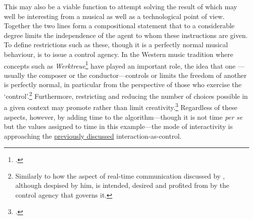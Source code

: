 This may also be a viable function to attempt solving the result of which may well be interesting from a musical as well as a technological point of view. Together the two lines form a compositional statement that to a considerable degree limits the independence of the agent to whom these instructions are given. To define restrictions such as these, though it is a perfectly normal musical behaviour, is to issue a control agency. In the Western music tradition where concepts such as \emph{Werktreue}\footcites(The German word \emph{Werktreue} means `to be faithful to the original'. It is commonly used in discussions concerning musical interpretation and musical ontology.)()[See][3]{benson03}[See also][]{goehr96} have played an important role, the idea that one ---usually the composer or the conductor---controls or limits the freedom of another is perfectly normal, in particular from the perspective of those who exercise the `control'.\footnote{Similarly to how the aspect of real-time communication discussed by \citeauthor{baudrillard02}, although despised by him, is intended, desired and profited from by the control agency that governs it.} Furthermore, restricting and reducing the number of choices possible in a given context may promote rather than limit creativity.\footcite[See][chap. 4]{evens05} Regardless of these aspects, however, by adding time to the algorithm---though it is not time \emph{per se} but the values assigned to time in this example---the mode of interactivity is approaching the \hyperlink{sec:inter-defin:par4}{previously discussed} interaction-as-control.

